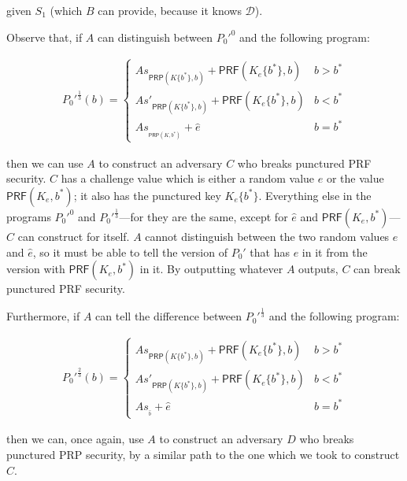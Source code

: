\documentclass{article}
\begin{document}
\begin{itemize}
\begin{itemize}
        given $S_1$ (which $B$ can provide, because it knows $\mathcal{D}$).
        
        Observe that, if $A$ can distinguish between $P_0'^0$ and the following program:
        
        \begin{align}
            P_0'^{\frac{1}{3}}(b) = 
            \begin{cases}
                As_{\textsf{PRP}(K\{b^*\}, b)} + \textsf{PRF}(K_e\{b^*\}, b) & b > b^* \\
                As'_{\textsf{PRP}(K\{b^*\}, b)} + \textsf{PRF}(K_e\{b^*\}, b) & b < b^* \\
                As_{_{\textsf{PRP}(K, b^*)}} + \hat e & b = b^*
            \end{cases}
        \end{align}
        
        then we can use $A$ to construct an adversary $C$ who breaks punctured PRF security. $C$ has a challenge value which is either a random value $e$ or the value $\textsf{PRF}(K_e, b^*)$; it also has the punctured key $K_e\{b^*\}$. Everything else in the programs $P_0'^0$ and $P_0'^{\frac{1}{3}}$---for they are the same, except for $\hat e$ and $\textsf{PRF}(K_e, b^*)$---$C$ can construct for itself. $A$ cannot distinguish between the two random values $e$ and $\hat e$, so it must be able to tell the version of $P_0'$ that has $e$ in it from the version with $\textsf{PRF}(K_e, b^*)$ in it. By outputting whatever $A$ outputs, $C$ can break punctured PRF security.
        
        Furthermore, if $A$ can tell the difference between $P_0'^{\frac{1}{3}}$ and the following program:
        
        \begin{align}
            P_0'^{\frac{2}{3}}(b) = 
            \begin{cases}
                As_{\textsf{PRP}(K\{b^*\}, b)} + \textsf{PRF}(K_e\{b^*\}, b) & b > b^* \\
                As'_{\textsf{PRP}(K\{b^*\}, b)} + \textsf{PRF}(K_e\{b^*\}, b) & b < b^* \\
                As_{_{\widehat b}} + \hat e & b = b^*
            \end{cases}
        \end{align}
        
        then we can, once again, use $A$ to construct an adversary $D$ who breaks punctured PRP security, by a similar path to the one which we took to construct $C$.
        

\end{itemize}
\end{itemize}
\end{document}

